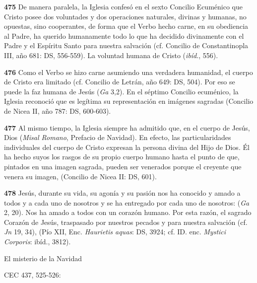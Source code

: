 \begin{body}
\begin{body}
\textbf{475} De manera paralela, la Iglesia confesó en el sexto Concilio Ecuménico que Cristo posee dos voluntades y dos operaciones naturales, divinas y humanas, no opuestas, sino cooperantes, de forma que el Verbo hecho carne, en su obediencia al Padre, ha querido humanamente todo lo que ha decidido divinamente con el Padre y el Espíritu Santo para nuestra salvación (cf. Concilio de Constantinopla III, año 681: DS, 556-559). La voluntad humana de Cristo  (\emph{ibíd}., 556).

\textbf{476} Como el Verbo se hizo carne asumiendo una verdadera humanidad, el cuerpo de Cristo era limitado (cf. Concilio de Letrán, año 649: DS, 504). Por eso se puede  la faz humana de Jesús (\emph{Ga} 3,2). En el séptimo Concilio ecuménico, la Iglesia reconoció que es legítima su representación en imágenes sagradas (Concilio de Nicea II, año 787: DS, 600-603).

\textbf{477} Al mismo tiempo, la Iglesia siempre ha admitido que, en el cuerpo de Jesús, Dios  (\emph{Misal Romano}, Prefacio de Navidad). En efecto, las particularidades individuales del cuerpo de Cristo expresan la persona divina del Hijo de Dios. Él ha hecho suyos los rasgos de su propio cuerpo humano hasta el punto de que, pintados en una imagen sagrada, pueden ser venerados porque el creyente que venera su imagen,  (Concilio de Nicea II: DS, 601).

\textbf{478} Jesús, durante su vida, su agonía y su pasión nos ha conocido y amado a todos y a cada uno de nosotros y se ha entregado por cada uno de nosotros:  (\emph{Ga} 2, 20). Nos ha amado a todos con un corazón humano. Por esta razón, el sagrado Corazón de Jesús, traspasado por nuestros pecados y para nuestra salvación (cf. \emph{Jn} 19, 34),  (Pío XII, Enc. \emph{Haurietis aquas}: DS, 3924; cf. ID. enc. \emph{Mystici Corporis}: ibíd., 3812).

El misterio de la Navidad

CEC 437, 525-526:


\end{body}
\end{body}
